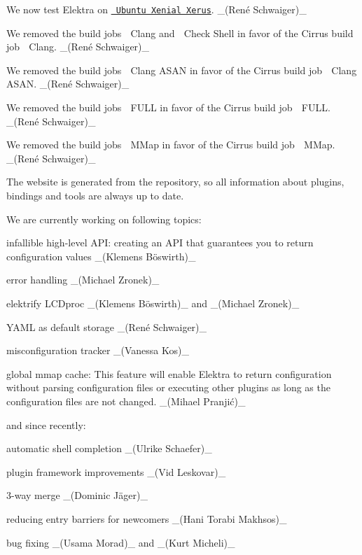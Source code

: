 \begin{DoxyItemize}
\item We now test Elektra on \href{https://docs.travis-ci.com/user/reference/xenial}{\texttt{ Ubuntu Xenial Xerus}}. \+\_\+(René Schwaiger)\+\_\+
\item We removed the build jobs {\ttfamily 🍏 Clang} and {\ttfamily 🍏 Check Shell} in favor of the Cirrus build job {\ttfamily 🍎 Clang}. \+\_\+(René Schwaiger)\+\_\+
\item We removed the build jobs {\ttfamily 🍏 Clang A\+S\+AN} in favor of the Cirrus build job {\ttfamily 🍎 Clang A\+S\+AN}. \+\_\+(René Schwaiger)\+\_\+
\item We removed the build jobs {\ttfamily 🍏 F\+U\+LL} in favor of the Cirrus build job {\ttfamily 🍎 F\+U\+LL}. \+\_\+(René Schwaiger)\+\_\+
\item We removed the build jobs {\ttfamily 🍏 M\+Map} in favor of the Cirrus build job {\ttfamily 🍎 M\+Map}. \+\_\+(René Schwaiger)\+\_\+
\end{DoxyItemize}

The website is generated from the repository, so all information about plugins, bindings and tools are always up to date.

We are currently working on following topics\+:


\begin{DoxyItemize}
\item infallible high-\/level A\+PI\+: creating an A\+PI that guarantees you to return configuration values \+\_\+(Klemens Böswirth)\+\_\+
\item error handling \+\_\+(\+Michael Zronek)\+\_\+
\item elektrify L\+C\+Dproc \+\_\+(Klemens Böswirth)\+\_\+ and \+\_\+(\+Michael Zronek)\+\_\+
\item Y\+A\+ML as default storage \+\_\+(René Schwaiger)\+\_\+
\item misconfiguration tracker \+\_\+(\+Vanessa Kos)\+\_\+
\item global mmap cache\+: This feature will enable Elektra to return configuration without parsing configuration files or executing other plugins as long as the configuration files are not changed. \+\_\+(Mihael Pranjić)\+\_\+
\end{DoxyItemize}

and since recently\+:


\begin{DoxyItemize}
\item automatic shell completion \+\_\+(\+Ulrike Schaefer)\+\_\+
\item plugin framework improvements \+\_\+(\+Vid Leskovar)\+\_\+
\item 3-\/way merge \+\_\+(Dominic Jäger)\+\_\+
\item reducing entry barriers for newcomers \+\_\+(\+Hani Torabi Makhsos)\+\_\+
\item bug fixing \+\_\+(\+Usama Morad)\+\_\+ and \+\_\+(\+Kurt Micheli)\+\_\+
\end{DoxyItemize}

